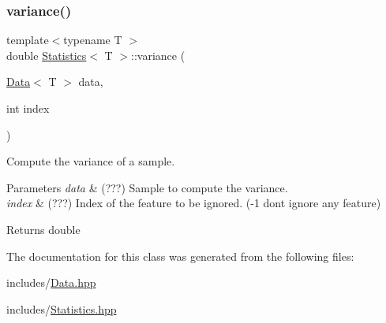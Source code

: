 \subsubsection{\texorpdfstring{variance()}{variance()}\hspace{0.1cm}{\footnotesize\ttfamily [2/2]}}
{\footnotesize\ttfamily template$<$typename T $>$ \\
double \mbox{\hyperlink{class_statistics}{Statistics}}$<$ T $>$\+::variance (\begin{DoxyParamCaption}\item[{\mbox{\hyperlink{class_data}{Data}}$<$ T $>$}]{data,  }\item[{int}]{index }\end{DoxyParamCaption})\hspace{0.3cm}{\ttfamily [static]}}



Compute the variance of a sample. 


\begin{DoxyParams}{Parameters}
{\em data} & (???) Sample to compute the variance. \\
\hline
{\em index} & (???) Index of the feature to be ignored. (-\/1 dont ignore any feature) \\
\hline
\end{DoxyParams}
\begin{DoxyReturn}{Returns}
double 
\end{DoxyReturn}


The documentation for this class was generated from the following files\+:\begin{DoxyCompactItemize}
\item 
includes/\mbox{\hyperlink{_data_8hpp}{Data.\+hpp}}\item 
includes/\mbox{\hyperlink{_statistics_8hpp}{Statistics.\+hpp}}\end{DoxyCompactItemize}
